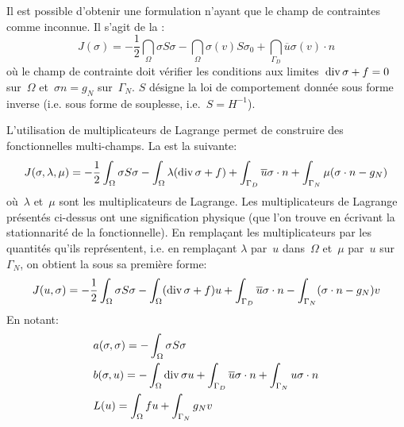 \medskip
Il est possible d'obtenir une formulation n'ayant que le champ de contraintes
comme inconnue. Il s'agit de la :
\begin{equation}
J(\sigma) =
-\frac12 \dint_\Omega \sigma S \sigma
-\dint_\Omega \sigma(v) S\sigma_0
+ \dint_{\Gamma_D} \overline{u} \sigma(v)\cdot n
\end{equation}
où le champ de contrainte doit vérifier les conditions aux limites~$\operatorname{div} \sigma + f =0$ sur~$\Omega$
et~$\sigma n = g_N$ sur~$\Gamma_N$.
$S$ désigne la loi de comportement donnée sous forme inverse (i.e. sous forme de
souplesse, i.e.~$S=H^{-1}$).

\medskip
L'utilisation de multiplicateurs de Lagrange permet de construire des fonctionnelles multi-champs.
La  est la suivante:
\begin{equation}
J(\sigma,\lambda,\mu) =
-\frac12\displaystyle\int_\Omega \sigma S \sigma
-\displaystyle\int_\Omega \lambda (\operatorname{div} \sigma + f)
+ \displaystyle\int_{\Gamma_D} \overline{u}\sigma\cdot n
+ \displaystyle\int_{\Gamma_N} \mu (\sigma\cdot n -g_N)
\end{equation}
où~$\lambda$ et~$\mu$ sont les multiplicateurs de Lagrange.
\medskip
Les multiplicateurs de Lagrange présentés ci-dessus ont une signification physique
(que l'on trouve en écrivant la stationnarité de la fonctionnelle).
En remplaçant les multiplicateurs par les quantités qu'ils représentent, i.e. en remplaçant
$\lambda$ par~$u$ dans~$\Omega$ et~$\mu$ par~$u$ sur~$\Gamma_N$, on obtient la
sous sa première forme:
\begin{equation}
J(u,\sigma) =
-\frac12 \displaystyle\int_\Omega \sigma S \sigma
-\displaystyle\int_\Omega (\operatorname{div} \sigma+f) u
+ \displaystyle\int_{\Gamma_D} \overline{u}\sigma\cdot n
- \displaystyle\int_{\Gamma_N} (\sigma\cdot n-g_N) v
\end{equation}
En notant:
\begin{align} 
&a(\sigma,\sigma)=-\displaystyle\int_\Omega \sigma S\sigma\\
&b(\sigma,u)=-\displaystyle\int_\Omega \operatorname{div}\sigma u + \displaystyle\int_{\Gamma_D} \overline{u}\sigma\cdot n + \displaystyle\int_{\Gamma_N} u\sigma\cdot n\\
&L(u)=\displaystyle\int_\Omega fu + \displaystyle\int_{\Gamma_N} g_N v\end{align}
